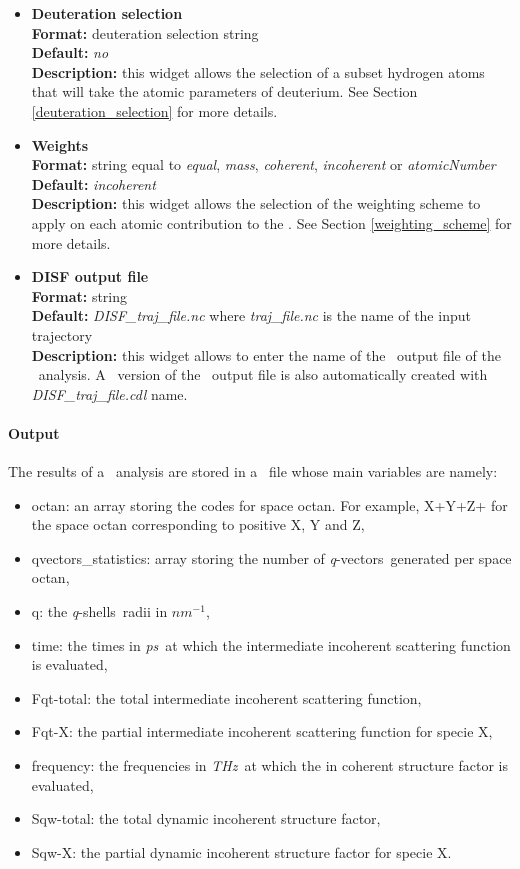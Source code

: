 \documentclass[a4paper,11pt]{report}
\newcommand{\ps}{\textit{ps}}
\newcommand{\invnm}{$nm^{-1}$}
\newcommand{\thz}{\textit{THz}}
\newcommand{\qvects}{\textit{q}-vectors}
\newcommand{\qshells}{\textit{q}-shells}
\begin{document}
\begin{itemize}
\item \textbf{Deuteration selection}\\
\textbf{Format:} deuteration selection string\\
\textbf{Default:} \textit{no}\\
\textbf{Description:} this widget allows the selection of a subset hydrogen atoms that will take the atomic parameters 
of deuterium. See Section \ref{deuteration_selection} for more details.

\item \textbf{Weights}\\
\textbf{Format:} string equal to \textit{equal}, \textit{mass}, \textit{coherent}, \textit{incoherent} or \textit{atomicNumber}\\
\textbf{Default:} \textit{incoherent}\\
\textbf{Description:} this widget allows the selection of the weighting scheme to apply on each atomic contribution 
to the \DISF . See Section \ref{weighting_scheme} for more details. 

\item \textbf{DISF output file}\\
\textbf{Format:} string\\
\textbf{Default:} \textit{DISF\_traj\_file.nc} where \textit{traj\_file.nc} is the name of the input trajectory\\
\textbf{Description:} this widget allows to enter the name of the \NetCDF\ output file of the \DISF\ analysis. A \CDL\ 
version of the \NetCDF\ output file is also automatically created with \textit{DISF\_traj\_file.cdl} name.
\end{itemize}

\paragraph{Output\\}
The results of a \DISF\ analysis are stored in a \NetCDF\ file whose main variables are namely:
\begin{itemize}
\item octan: an array storing the codes for space octan. For example, X+Y+Z+ for the space octan corresponding to positive
X, Y and Z,
\item qvectors\_statistics: array storing the number of \qvects\ generated per space octan,
\item q: the \qshells\ radii in \invnm ,
\item time: the times in \ps\ at which the intermediate incoherent scattering function is evaluated,
\item Fqt-total: the total intermediate incoherent scattering function,
\item Fqt-X: the partial intermediate incoherent scattering function for specie X,
\item frequency: the frequencies in \thz\ at which the in coherent structure factor is evaluated,
\item Sqw-total: the total dynamic incoherent structure factor,
\item Sqw-X: the partial dynamic incoherent structure factor for specie X.
\end{itemize}
\end{document}

